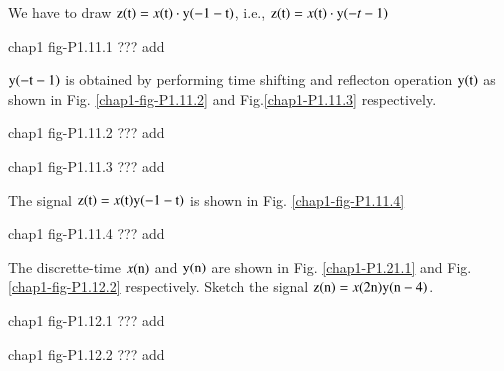 \begin{solution}
We have to draw ${\textrm{z}(\textrm{t})} = x(\textrm{t})\cdot\textrm{y}(-1-\textrm{t})$, i.e., ${\textrm{z}(\textrm{t})} =x(\textrm{t}) \cdot \textrm{y}(-t-1)$
\begin{center}
chap1 fig-P1.11.1 ??? add
\end{center}
$\textrm{y}(-\textrm{t}-1)$ is obtained by performing time shifting and reflecton operation $\textrm{y}(\textrm{t})$ as shown in Fig. \ref{chap1-fig-P1.11.2} and  Fig.\ref{chap1-P1.11.3} respectively.
\begin{center}
chap1 fig-P1.11.2 ??? add
\end{center}

\begin{center}
chap1 fig-P1.11.3 ??? add
\end{center}

The signal ${\textrm{z}(\textrm{t})} = x(\textrm{t}) \textrm{y}(-1-\textrm{t})$ is shown in Fig. \ref{chap1-fig-P1.11.4}
\begin{center}
chap1 fig-P1.11.4 ??? add
\end{center}
\end{solution}

\begin{example}
The discrette-time $x(\textrm{n})$ and $\textrm{y}(\textrm{n})$ are shown in Fig. \ref{chap1-P1.21.1} and Fig. \ref{chap1-fig-P1.12.2} respectively. Sketch the signal ${\textrm{z}(\textrm{n})} = x(2\textrm{n}) \textrm{y}(\textrm{n}-4)$.
\begin{center}
chap1 fig-P1.12.1 ??? add
\end{center}
\begin{center}
chap1 fig-P1.12.2 ??? add
\end{center}
\end{example}

